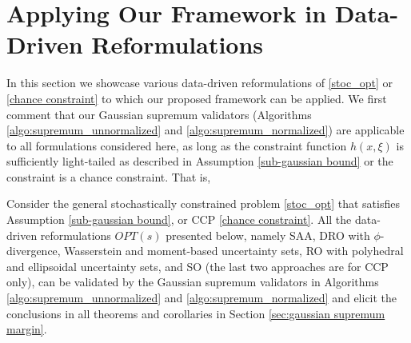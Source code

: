 \documentclass[mnsc,blindrev]{informs4} %
\begin{document}


















\section{Applying Our Framework in Data-Driven Reformulations}\label{sec:formulation showcase}
In this section we showcase various data-driven reformulations of \eqref{stoc_opt} or \eqref{chance constraint} to which our proposed framework can be applied. We first comment that our Gaussian supremum validators (Algorithms \ref{algo:supremum_unnormalized} and \ref{algo:supremum_normalized}) are applicable to all formulations considered here, as long as the constraint function $h(x,\xi)$ is sufficiently light-tailed as described in Assumption \ref{sub-gaussian bound} or the constraint is a chance constraint. That is,
\begin{theorem}
Consider the general stochastically constrained problem \eqref{stoc_opt} that satisfies Assumption \ref{sub-gaussian bound}, or CCP \eqref{chance constraint}. All the data-driven reformulations $OPT(s)$ presented below, namely SAA, DRO with $\phi$-divergence, Wasserstein and moment-based uncertainty sets, RO with polyhedral and ellipsoidal uncertainty sets, and SO (the last two approaches are for CCP only), can be validated by the Gaussian supremum validators in Algorithms \ref{algo:supremum_unnormalized} and \ref{algo:supremum_normalized} and elicit the conclusions in all theorems and corollaries in Section \ref{sec:gaussian supremum margin}.
\end{theorem}
\end{document}
